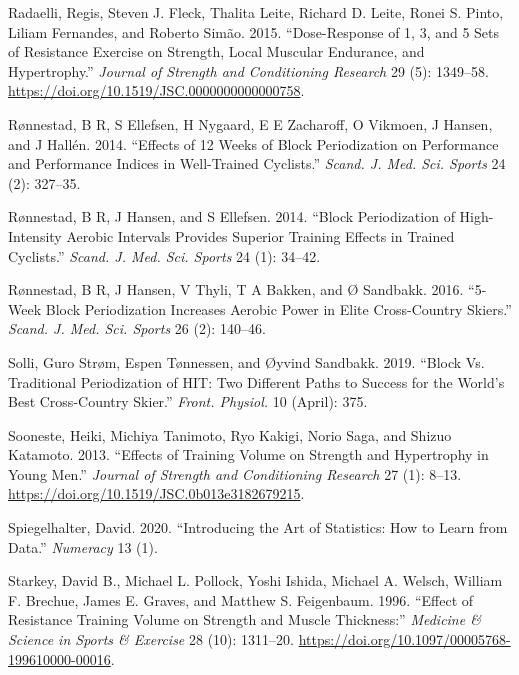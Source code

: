 \documentclass[
  letterpaper,
  DIV=11,
  numbers=noendperiod]{scrreprt}
\newlength{\cslhangindent}
\newenvironment{CSLReferences}[2] %
 {\begin{list}{}{%
  \setlength{\itemindent}{0pt}
  \setlength{\leftmargin}{0pt}
  \setlength{\parsep}{0pt}
  \ifodd #1
   \setlength{\leftmargin}{\cslhangindent}
   \setlength{\itemindent}{-1\cslhangindent}
  \fi
  \setlength{\itemsep}{#2\baselineskip}}}
 {\end{list}}
\begin{document}
\begin{CSLReferences}{1}{0}
Radaelli, Regis, Steven J. Fleck, Thalita Leite, Richard D. Leite, Ronei
S. Pinto, Liliam Fernandes, and Roberto Simão. 2015. {``Dose-Response of
1, 3, and 5 Sets of Resistance Exercise on Strength, Local Muscular
Endurance, and Hypertrophy.''} \emph{Journal of Strength and
Conditioning Research} 29 (5): 1349--58.
\url{https://doi.org/10.1519/JSC.0000000000000758}.

Rønnestad, B R, S Ellefsen, H Nygaard, E E Zacharoff, O Vikmoen, J
Hansen, and J Hallén. 2014. {``Effects of 12 Weeks of Block
Periodization on Performance and Performance Indices in Well-Trained
Cyclists.''} \emph{Scand. J. Med. Sci. Sports} 24 (2): 327--35.

Rønnestad, B R, J Hansen, and S Ellefsen. 2014. {``Block Periodization
of High-Intensity Aerobic Intervals Provides Superior Training Effects
in Trained Cyclists.''} \emph{Scand. J. Med. Sci. Sports} 24 (1):
34--42.

Rønnestad, B R, J Hansen, V Thyli, T A Bakken, and Ø Sandbakk. 2016.
{``5-Week Block Periodization Increases Aerobic Power in Elite
Cross-Country Skiers.''} \emph{Scand. J. Med. Sci. Sports} 26 (2):
140--46.

Solli, Guro Strøm, Espen Tønnessen, and Øyvind Sandbakk. 2019. {``Block
Vs. Traditional Periodization of {HIT}: Two Different Paths to Success
for the World's Best Cross-Country Skier.''} \emph{Front. Physiol.} 10
(April): 375.

Sooneste, Heiki, Michiya Tanimoto, Ryo Kakigi, Norio Saga, and Shizuo
Katamoto. 2013. {``Effects of Training Volume on Strength and
Hypertrophy in Young Men.''} \emph{Journal of Strength and Conditioning
Research} 27 (1): 8--13.
\url{https://doi.org/10.1519/JSC.0b013e3182679215}.

Spiegelhalter, David. 2020. {``Introducing the Art of Statistics: How to
Learn from Data.''} \emph{Numeracy} 13 (1).

Starkey, David B., Michael L. Pollock, Yoshi Ishida, Michael A. Welsch,
William F. Brechue, James E. Graves, and Matthew S. Feigenbaum. 1996.
{``Effect of Resistance Training Volume on Strength and Muscle
Thickness:''} \emph{Medicine \& Science in Sports \& Exercise} 28 (10):
1311--20. \url{https://doi.org/10.1097/00005768-199610000-00016}.


\end{CSLReferences}
\end{document}
